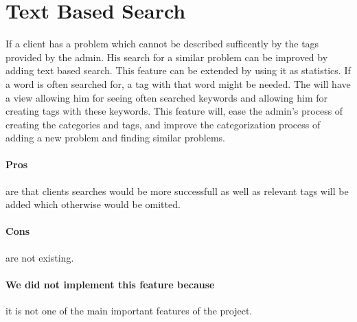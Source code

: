 \section{Text Based Search}
\label{sec:text_based_search}
If a client has a problem which cannot be described sufficently by the tags provided by the admin. 
His search for a similar problem can be improved by adding text based search. 
This feature can be extended by using it as statistics. If a word is often searched for, a tag with that word might be needed. 
The \admin[] will have a view allowing him for seeing often searched keywords and allowing him for creating tags with these keywords.
This feature will, ease the admin's process of creating the categories and tags, and improve the categorization process of adding a new problem and finding similar problems.

\paragraph{Pros} are that clients searches would be more successfull as well as relevant tags will be added which otherwise would be omitted.
\paragraph{Cons} are not existing.
\paragraph{We did not implement this feature because} it is not one of the main important features of the project. 